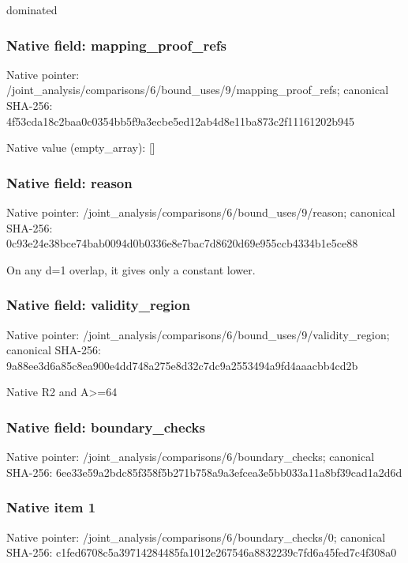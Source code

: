 \documentclass[10pt,a4paper]{article}
\begin{document}
\begingroup\raggedright\sloppy dominated\par\endgroup

\subsubsection{Native field: mapping\_\allowbreak{}proof\_\allowbreak{}refs}
Native pointer: /joint\_\allowbreak{}analysis/comparisons/6/bound\_\allowbreak{}uses/9/mapping\_\allowbreak{}proof\_\allowbreak{}refs; canonical SHA-256: 4f53cda18c2baa0c0354bb5f9a3ecbe5ed12ab4d8e11ba873c2f11161202b945

Native value (empty\_\allowbreak{}array): []

\subsubsection{Native field: reason}
Native pointer: /joint\_\allowbreak{}analysis/comparisons/6/bound\_\allowbreak{}uses/9/reason; canonical SHA-256: 0c93e24e38bce74bab0094d0b0336e8e7bac7d8620d69e955ccb4334b1e5ce88

\begingroup\raggedright\sloppy On any d=\allowbreak{}1 overlap,\allowbreak{} it gives only a constant lower.\par\endgroup

\subsubsection{Native field: validity\_\allowbreak{}region}
Native pointer: /joint\_\allowbreak{}analysis/comparisons/6/bound\_\allowbreak{}uses/9/validity\_\allowbreak{}region; canonical SHA-256: 9a88ee3d6a85c8ea900e4dd748a275e8d32c7dc9a2553494a9fd4aaacbb4cd2b

\begingroup\raggedright\sloppy Native R2 and A>=\allowbreak{}64\par\endgroup

\subsubsection{Native field: boundary\_\allowbreak{}checks}
Native pointer: /joint\_\allowbreak{}analysis/comparisons/6/boundary\_\allowbreak{}checks; canonical SHA-256: 6ee33e59a2bdc85f358f5b271b758a9a3efcea3e5bb033a11a8bf39cad1a2d6d

\subsubsection{Native item 1}
Native pointer: /joint\_\allowbreak{}analysis/comparisons/6/boundary\_\allowbreak{}checks/0; canonical SHA-256: c1fed6708c5a39714284485fa1012e267546a8832239c7fd6a45fed7c4f308a0
\end{document}
